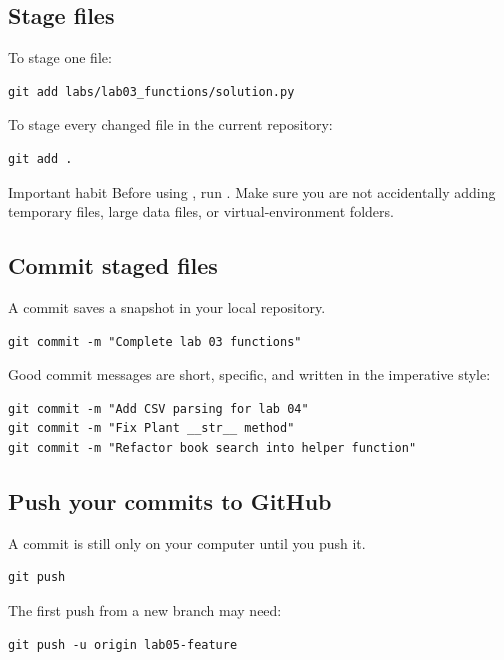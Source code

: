 \documentclass[11pt]{article}
\begin{document}
\subsection{Stage files}
To stage one file:

\begin{lstlisting}[style=terminal]
git add labs/lab03_functions/solution.py
\end{lstlisting}

To stage every changed file in the current repository:

\begin{lstlisting}[style=terminal]
git add .
\end{lstlisting}

\begin{warningbox}{Important habit}
Before using , run .  Make sure you are not accidentally adding temporary files, large data files, or virtual-environment folders.
\end{warningbox}

\subsection{Commit staged files}
A commit saves a snapshot in your local repository.

\begin{lstlisting}[style=terminal]
git commit -m "Complete lab 03 functions"
\end{lstlisting}

Good commit messages are short, specific, and written in the imperative style:

\begin{lstlisting}[style=terminal]
git commit -m "Add CSV parsing for lab 04"
git commit -m "Fix Plant __str__ method"
git commit -m "Refactor book search into helper function"
\end{lstlisting}

\subsection{Push your commits to GitHub}
A commit is still only on your computer until you push it.

\begin{lstlisting}[style=terminal]
git push
\end{lstlisting}

The first push from a new branch may need:

\begin{lstlisting}[style=terminal]
git push -u origin lab05-feature
\end{lstlisting}
\end{document}
